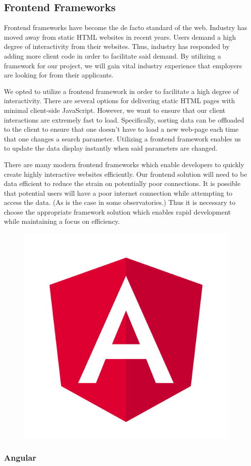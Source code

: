 \documentclass[12pt]{report}
\begin{document}
\begin{enumerate}
\subsection*{Frontend Frameworks}

Frontend frameworks have become the de facto standard of the web. Industry has moved away from static HTML websites in recent years. Users demand a high degree of interactivity from their websites. Thus, industry has responded by adding more client code in order to facilitate said demand. By utilizing a framework for our project, we will gain vital industry experience that employers are looking for from their applicants.

We opted to utilize a frontend framework in order to facilitate a high degree of interactivity. There are several options for delivering static HTML pages with minimal client-side JavaScript. However, we want to ensure that our client interactions are extremely fast to load. Specifically, sorting data can be offloaded to the client to ensure that one doesn't have to load a new web-page each time that one changes a search parameter. Utilizing a frontend framework enables us to update the data display instantly when said parameters are changed.

There are many modern frontend frameworks which enable developers to quickly create highly interactive websites efficiently. Our frontend solution will need to be data efficient to reduce the strain on potentially poor connections. It is possible that potential users will have a poor internet connection while attempting to access the data. (As is the case in some observatories.) Thus it is necessary to choose the appropriate framework solution which enables rapid development while maintaining a focus on efficiency.

\begin{figure}[h]
	\centering
	\includegraphics[width=0.251\linewidth]{angular}
\end{figure}

\subsubsection*{Angular}


\end{enumerate}
\end{document}
